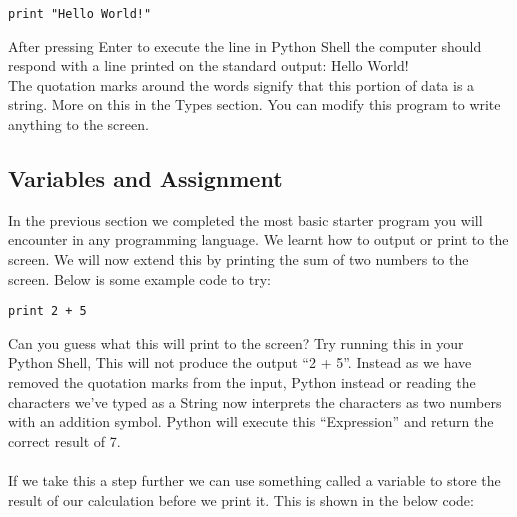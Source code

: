 \documentclass[twocolumn]{article}
\begin{document}
\begin{lstlisting}
print "Hello World!"
\end{lstlisting}
After pressing Enter to execute the line in Python Shell the computer should respond with a line printed on the standard output: Hello World!\\ The quotation marks around the words signify that this portion of data is a string. More on this in the Types section. You can modify this program to write anything to the screen.


\subsection{Variables and Assignment}

In the previous section we completed the most basic starter program you will encounter in any programming language. We learnt how to output or print to the screen. We will now extend this by printing the sum of two numbers to the screen. Below is some example code to try:

\begin{lstlisting}
print 2 + 5
\end{lstlisting}
Can you guess what this will print to the screen? Try running this in your Python Shell, This will not produce the output ``2 + 5''. Instead as we have removed the quotation marks from the input, Python instead or reading the characters we've typed as a String now interprets the characters as two numbers with an addition symbol. Python will execute this ``Expression'' and return the correct result of 7. \\
\\
If we take this a step further we can use something called a variable to store the result of our calculation before we print it. This is shown in the below code:
\end{document}
